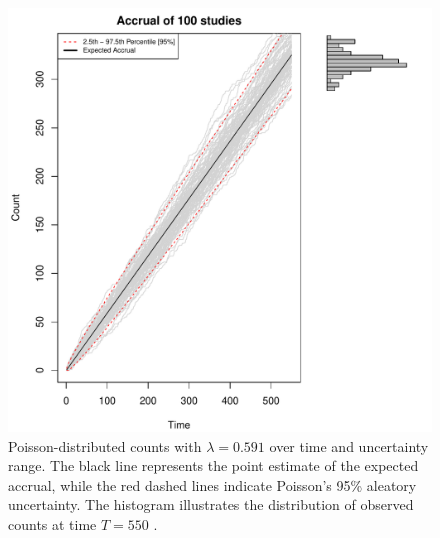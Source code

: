 \begin{figure}
\begin{knitrout}
\color{fgcolor}

{\centering \includegraphics[width=\textwidth-3cm]{figure/ch02_figunnamed-chunk-3-1} 

}


\end{knitrout}
  \caption{Poisson-distributed counts with $\lambda = 0.591$ over time and uncertainty range. The black line represents the point estimate of the expected accrual, while the red dashed lines indicate Poisson's 95\% aleatory uncertainty. The histogram illustrates the distribution of observed counts at time $T = 550$ \citep{spiegelhalter2011visualizing}.}
  \label{fig:2_2}
\end{figure}


